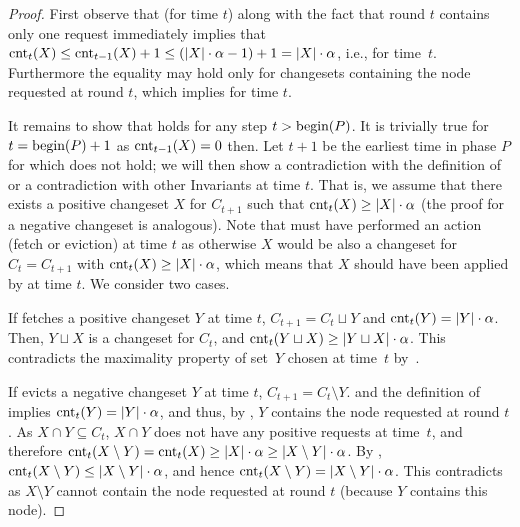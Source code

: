 \begin{proof}
First observe that  (for time $t$) along with the
fact that round $t$ contains only one request immediately implies that
$\textrm{cnt}_t(X) \leq \textrm{cnt}_{t-1}(X) + 1 \leq (|X| \cdot \alpha - 1) + 1 = |X|
\cdot \alpha$, i.e.,  for time~$t$. Furthermore the equality may
hold only for changesets containing the node requested at round $t$, which
implies  for time $t$.

It remains to show that  holds for any step $t >
\textrm{begin}(P)$. It is trivially true for $t = \textrm{begin}(P)+1$ 
as $\textrm{cnt}_{t-1}(X) = 0$ then. Let $t+1$ be the earliest time in phase $P$ for
which  does not hold; we will then show a
contradiction with the definition of \ALGTC or a contradiction with other
Invariants at time $t$. That is, we assume that there exists a positive
changeset $X$ for $C_{t+1}$ such that $\textrm{cnt}_t(X) \geq |X| \cdot \alpha$ (the
proof for a negative changeset is analogous). Note that \ALGTC must have
performed an action (fetch or eviction) at time $t$ as otherwise $X$ would be
also  a changeset for $C_t = C_{t+1}$ with $\textrm{cnt}_t(X) \geq |X| \cdot \alpha$,
which means that $X$ should have been applied by \ALGTC at time $t$. We consider
two cases.

If \ALGTC fetches a positive changeset $Y$ at time $t$, $C_{t+1} = C_t \sqcup Y$
and $\textrm{cnt}_t(Y) = |Y|\cdot\alpha$. Then, $Y \sqcup X$ is a changeset for $C_t$,
and $\textrm{cnt}_t(Y \sqcup X) \geq |Y \sqcup X| \cdot \alpha$. This contradicts
the maximality property of set~$Y$ chosen at time~$t$ by~\ALGTC.

If \ALGTC evicts a negative changeset $Y$ at time $t$, $C_{t+1} = C_t \setminus
Y$.  and the definition of \ALGTC implies $\textrm{cnt}_t(Y) =
|Y| \cdot \alpha$, and thus, by , $Y$ contains
the node requested at round $t$. As $X \cap Y \subseteq C_t$, \mbox{$X \cap Y$} does
not have any positive requests at time~$t$, and therefore $\textrm{cnt}_t(X \setminus
Y) = \textrm{cnt}_t(X) \geq |X| \cdot \alpha \geq |X \setminus Y| \cdot \alpha$. By
, $\textrm{cnt}_t(X \setminus Y) \leq |X \setminus Y|
\cdot \alpha$, and hence $\textrm{cnt}_t(X \setminus Y) = |X \setminus Y| \cdot
\alpha$. This contradicts  as $X \setminus Y$
cannot contain the node requested at round $t$ (because $Y$ contains this
node).
\end{proof}


